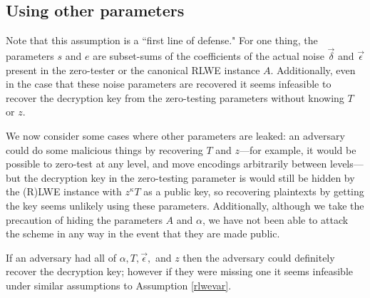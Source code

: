 \subsection{Using other parameters}
Note that this assumption is a ``first line of defense."  For one thing, the parameters $s$ and $e$ are subset-sums of the coefficients of the actual noise $\vec{\delta}$ and $\vec{\epsilon}$ present in the zero-tester or the canonical RLWE instance $A$. Additionally, even in the case that these noise parameters are recovered it seems infeasible to recover the decryption key from the zero-testing parameters without knowing $T$ or $z$.  

We now consider some cases where other parameters are leaked:  an adversary could do some malicious things by recovering $T$ and $z$---for example, it would be possible to zero-test at any level, and move encodings arbitrarily between levels---but the decryption key in the zero-testing parameter is would still be hidden by the (R)LWE instance with $z^\kappa T$ as a public key, so recovering plaintexts by getting the key seems unlikely using these parameters.  Additionally, although we take the precaution of hiding the parameters $A$ and $\alpha$, we have not been able to attack the scheme in any way in the event that they are made public.

If an adversary had all of $\alpha, T, \vec{\epsilon},$ and $z$ then the adversary could definitely recover the decryption key; however if they were missing one it seems infeasible under similar assumptions to Assumption \ref{rlwevar}.

